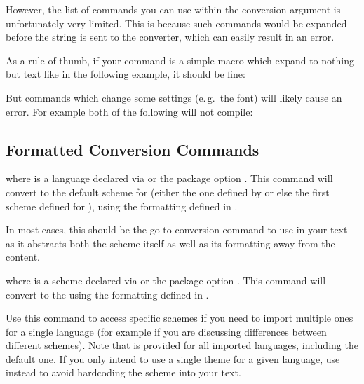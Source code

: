 \documentclass{ltxdockit}
\begin{document}
However, the list of commands you can use within the conversion argument is
unfortunately very limited. This is because such commands would be expanded
before the string is sent to the converter, which can easily result in an error.

As a rule of thumb, if your command is a simple macro which expand to nothing
but text like in the following example, it should be fine:

\begin{ltxcode}
  \newcommand\mystring{Zhe4 mei2you3 wen4ti2.}
  \topinyin{\mystring}
\end{ltxcode}

But commands which change some settings (e.\,g.\ the font) will likely
cause an error. For example both of the following will not compile:

\begin{ltxcode}
\end{ltxcode}

\noindent

\subsection{Formatted Conversion Commands}

\begin{ltxsyntax}

  where  is a language declared via
   or the package option .
  This command will convert  to the default scheme for 
  (either the one defined by  or else the first scheme
  defined for ), using the formatting defined in
  .

  In most cases, this should be the go-to conversion command to use in your text
  as it abstracts both the scheme itself as well as its formatting away from the
  content.


  where  is a scheme declared via
   or the package option .
  This command will convert  to the  using the formatting
  defined in .

  Use this command to access specific schemes if you need to import multiple
  ones for a single language (for example if you are discussing differences
  between different schemes). Note that  is
  provided for all imported languages, including the default one. If you only
  intend to use a single theme for a given language, use
   instead to avoid hardcoding the scheme into your
  text.

\end{ltxsyntax}
\end{document}
